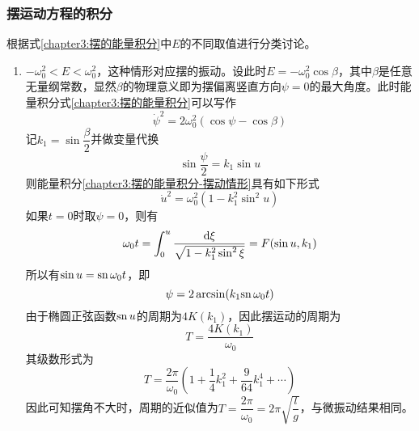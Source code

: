 \subsubsection{摆运动方程的积分}\label{chapter3:subsubsection-摆运动方程的积分}

根据式\eqref{chapter3:摆的能量积分}中$E$的不同取值进行分类讨论。
\begin{enumerate}
\item $-\omega_0^2<E<\omega_0^2$，这种情形对应摆的振动。设此时$E=-\omega_0^2\cos\beta$，其中$\beta$是任意无量纲常数，显然$\beta$的物理意义即为摆偏离竖直方向$\psi=0$的最大角度。此时能量积分式\eqref{chapter3:摆的能量积分}可以写作
\begin{equation}
	\dot{\psi}^2 = 2\omega_0^2(\cos\psi-\cos\beta)
	\label{chapter3:摆的能量积分-摆动情形}
\end{equation}
记$k_1=\sin\dfrac{\beta}{2}$并做变量代换
\begin{equation*}
	\sin\dfrac{\psi}{2}=k_1\sin u
\end{equation*}
则能量积分\eqref{chapter3:摆的能量积分-摆动情形}具有如下形式
\begin{equation}
	\dot{u}^2 = \omega_0^2(1-k_1^2\sin^2u)
\end{equation}
如果$t=0$时取$\psi=0$，则有
\begin{equation}
	\omega_0t = \int_0^u \frac{\mathrm{d} \xi}{\sqrt{1-k_1^2\sin^2\xi}} = F(\sin u,k_1)
\end{equation}
所以有$\sin u = \mathrm{sn}\, \omega_0t$，即
\begin{equation}
	\psi = 2\arcsin(k_1\mathrm{sn}\, \omega_0t)
\end{equation}
由于椭圆正弦函数$\mathrm{sn}\, u$的周期为$4K(k_1)$，因此摆运动的周期为
\begin{equation}
	T = \frac{4K(k_1)}{\omega_0}
\end{equation}
其级数形式为
\begin{equation}
	T = \frac{2\pi}{\omega_0}\left(1+\frac14k_1^2+\frac{9}{64}k_1^4+\cdots\right)
\end{equation}
因此可知摆角不大时，周期的近似值为$T=\dfrac{2\pi}{\omega_0}=2\pi\sqrt{\dfrac lg}$，与微振动结果相同。


\end{enumerate}
